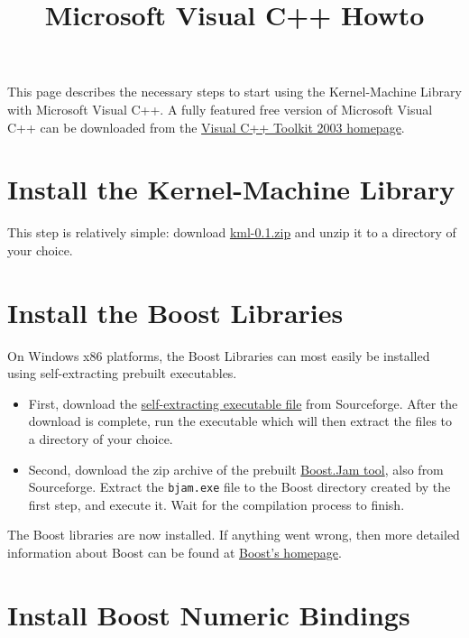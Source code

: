 \documentclass{article}
\begin{document}
\title{Microsoft Visual C++ Howto}
\maketitle

This page describes the necessary steps to start using 
the Kernel-Machine Library with Microsoft Visual C++.
A fully featured free version of Microsoft Visual
C++ can be downloaded from the
\href{http://msdn.microsoft.com/visualc/vctoolkit2003/}{Visual
C++ Toolkit 2003 homepage}.\\


\section{Install the Kernel-Machine Library}

This step is relatively simple: download
\href{research/kml/kml-0.1.zip}{kml-0.1.zip}
and unzip it to a directory of your choice.


\section{Install the Boost Libraries}

On Windows x86 platforms, the Boost Libraries can most easily 
be installed using self-extracting prebuilt executables.
%
\begin{itemize}
\item First, download the 
\href{http://prdownloads.sourceforge.net/boost/boost_1_32_0.exe?download}
{self-extracting executable file} from Sourceforge. 
After the download is complete, run the
executable which will then extract the files to a directory of your
choice.

\item Second, download the zip archive of the prebuilt
\href{http://prdownloads.sourceforge.net/boost/boost-jam-3.1.10-1-ntx86.zip?download}
{Boost.Jam tool}, also from Sourceforge. 
Extract the \texttt{bjam.exe} file to the Boost directory created by the first step, 
and execute it. Wait for the compilation process to finish.
\end{itemize}
%
The Boost libraries are now installed. If anything went wrong, then more detailed information about 
Boost can be found at  \href{http://www.boost.org/}{Boost's homepage}.



\section{Install Boost Numeric Bindings}
\end{document}
